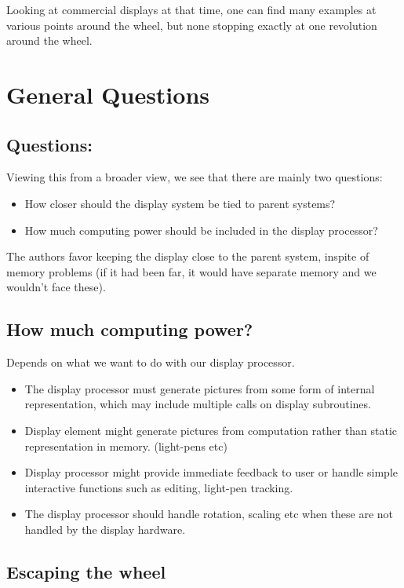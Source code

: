\documentclass[11pt]{article}
\begin{document}
Looking at commercial displays at that time, one can find many examples
at various points around the wheel, but none stopping exactly at one
revolution around the wheel.
\section{General Questions}
\label{sec:orgbd9c25c}

\subsection{Questions:}
\label{sec:org2bcb44f}

Viewing this from a broader view, we see that there are mainly two
questions:

\begin{itemize}
\item How closer should the display system be tied to parent systems?
\item How much computing power should be included in the display processor?
\end{itemize}

The authors favor keeping the display close to the parent system,
inspite of memory problems (if it had been far, it would have separate
memory and we wouldn't face these).

\subsection{How much computing power?}
\label{sec:org38a81ab}

Depends on what we want to do with our display processor.

\begin{itemize}
\item The display processor must generate pictures from some form of 
internal representation, which may include multiple calls
on display subroutines.
\item Display element might generate pictures from computation rather
than static representation in memory. (light-pens etc)
\item Display processor might provide immediate feedback to user or handle
simple interactive functions such as editing, light-pen tracking.
\item The display processor should handle rotation, scaling etc when
these are not handled by the display hardware.
\end{itemize}
\subsection{Escaping the wheel}
\label{sec:org7de1e09}
\end{document}
